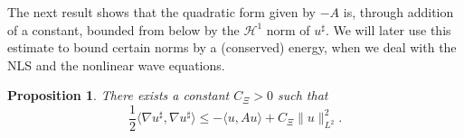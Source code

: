 \documentclass[11pt, oneside]{article}   	%
\newtheorem{proposition}[theorem]{Proposition}
\newcommand{\ssp}{\mathscr{H}}
\begin{document}
The next result shows that the quadratic form given by $- A$ is, through addition of a constant, bounded from
below by the $\ssp^1$ norm of $u^{\sharp}$.   We  will later use this estimate to bound certain norms by a (conserved)
energy, when we deal with the NLS and the nonlinear wave equations. 



\begin{proposition}
	\label{lem:2dh1bound}There exists a constant $C_{\Xi}>0$ such that
	\begin{equation} \label{equ:2dconstant}
	\frac{1}{2} \langle \nabla u^{\sharp}, \nabla u^{\sharp} \rangle
	\le - \langle u, A u \rangle + C_{\Xi} \| u \|_{L^2}^2 .
	 \end{equation}
\end{proposition}
\end{document}
